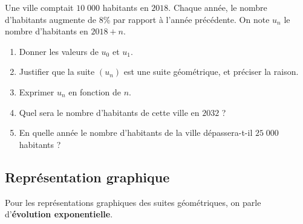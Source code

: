 \documentclass[11pt]{article}
\begin{document}
\begin{app}
  Une ville comptait $10\;000$ habitants en $2018$. Chaque année, le nombre
  d'habitants augmente de $8$\% par rapport à l'année précédente. On note $u_n$
  le nombre d'habitants en $2018+n$.
  \begin{enumerate}
    \item Donner les valeurs de $u_0$ et $u_1$.
    \item Justifier que la suite $\left( u_n \right)$ est une suite géométrique,
      et préciser la raison.
    \item Exprimer $u_n$ en fonction de $n$.
    \item Quel sera le nombre d'habitants de cette ville en $2032$ ?
    \item En quelle année le nombre d'habitants de la ville dépassera-t-il
      $25\;000$ habitants ?
  \end{enumerate}
\end{app}

\subsection{Représentation graphique}

\begin{prop}
  Pour les représentations graphiques des suites géométriques, on parle
  d'\textbf{évolution exponentielle}.
\end{prop}
\end{document}
